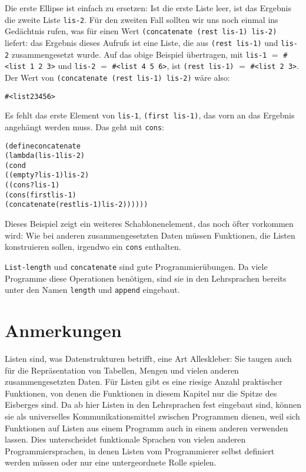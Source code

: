 %
Die erste Ellipse ist einfach zu ersetzen:  Ist die erste Liste
leer, ist das Ergebnis die zweite Liste \texttt{lis-2}.  Für den
zweiten Fall sollten wir uns noch einmal ins Gedächtnis rufen,
was für einen Wert \texttt{(concatenate (rest lis-1) lis-2)} liefert: das Ergebnis
dieses Aufrufs ist eine
Liste, die aus \texttt{(rest lis-1)} und \texttt{lis-2} zusammengesetzt
wurde.  Auf das obige Beispiel übertragen, mit \texttt{lis-1} $=$
\verb|#<list 1 2 3>| und \texttt{lis-2} $=$
\verb|#<list 4 5 6>|, ist \texttt{(rest lis-1)} $=$ \verb|#<list 2 3>|.
Der Wert von \texttt{(concatenate (rest lis-1) lis-2)} wäre
also:
%
\begin{alltt}
#<list 2 3 4 5 6>
\end{alltt}
%
Es fehlt das erste Element von \texttt{lis-1}, \texttt{(first
  lis-1)}, das vorn an das Ergebnis angehängt werden muss.  Das geht
mit \texttt{cons}:
%
\begin{alltt}
(define concatenate
  (lambda (lis-1 lis-2)
    (cond
      ((empty? lis-1) lis-2)
      ((cons? lis-1) 
       (cons (first lis-1)
                  (concatenate (rest lis-1) lis-2))))))
\end{alltt}
%
Dieses Beispiel zeigt ein weiteres Schablonenelement, das noch öfter
vorkommen wird:  Wie bei anderen zusammengesetzten Daten müssen Funktionen, die
Listen konstruieren sollen, irgendwo ein \texttt{cons} enthalten.

\texttt{List-length} und \texttt{concatenate} sind gute
Programmierübungen.  Da viele Programme diese Operationen benötigen,
sind sie in den Lehrsprachen  bereits unter den Namen
\texttt{length} und
\texttt{append} eingebaut.


\section*{Anmerkungen}

Listen sind, was Datenstrukturen betrifft, eine Art Alleskleber:
Sie taugen auch für die Repräsentation von Tabellen,
Mengen und vielen anderen zusammengesetzten Daten.  Für Listen gibt es
eine riesige Anzahl praktischer Funktionen, von denen die Funktionen in
diesem Kapitel nur die Spitze des Eisberges sind.  Da 
ab hier Listen in den Lehrsprachen fest eingebaut sind, können sie als universelles
Kommunikationsmittel zwischen Programmen dienen, weil sich Funktionen
auf Listen aus einem Programm auch in einem anderen verwenden lassen.
Dies unterscheidet funktionale Sprachen von vielen anderen Programmiersprachen, in
denen Listen vom Programmierer selbst definiert werden müssen oder nur
eine untergeordnete Rolle spielen.

